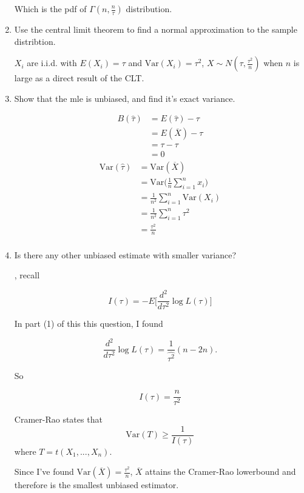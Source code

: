 \documentclass{tufte-book}
\newcommand{\Var}{\mathrm{Var}}
\theoremstyle{mytheoremstyle}
\theoremstyle{mylemstyle}
\theoremstyle{mydefstyle}
\begin{document}
\begin{enumerate}
Which is the pdf of $\Gamma(n, \frac{n}{\tau})$ distribution.

\item Use the central limit theorem to find a normal approximation to the sample distribtion.

 $X_i$ are i.i.d. with $E(X_i) = \tau$ and $\Var(X_i)=\tau^2$, $X \sim N(\tau, \frac{\tau^2}{n})$ when $n$ is large as a direct result of the CLT.

\item Show that the mle is unbiased, and find it's exact variance.

\begin{align*}
B(\hat{\tau}) &= E(\hat{\tau}) - \tau\\
&= E(\overline{X}) - \tau \\
&= \tau - \tau \\
&= 0
\end{align*}
\begin{align*}
\Var(\hat{\tau}) &= \Var(\overline{X})\\
&= \Var\Big( \frac{1}{n} \sum_{i=1}^n x_i \Big)\\
&= \frac{1}{n^2} \sum_{i=1}^n \Var(X_i) \\
&= \frac{1}{n^2} \sum_{i=1}^n \tau^2 \\
&= \frac{\tau^2}{n}\\
\end{align*}

\item Is there any other unbiased estimate with smaller variance?

, recall

\[ I(\tau) = -E\Big[ \frac{d^2}{d\tau^2} \log L(\tau)\Big] \]

In part (1) of this this question, I found

\[\frac{d^2}{d\tau^2} \log L(\tau) = \frac{1}{\hat{\tau^2}}(n-2n). \]

So

\[ I(\tau) = \frac{n}{\tau^2} \]

Cramer-Rao states that 
\[\Var(T) \geq \frac{1}{I(\tau)} \]
where $T=t(X_1,...,X_n)$.

Since I've found $\Var(\overline{X}) = \frac{\tau^2}{n}$, $\overline{X}$ attains the Cramer-Rao lowerbound and therefore is the smallest unbiased estimator.
\end{enumerate}
\end{document}
